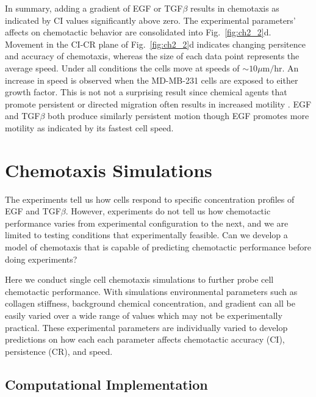 In summary, adding a gradient of EGF or TGF$\beta$ results in chemotaxis as indicated by CI values significantly above zero. The experimental parameters' affects on chemotactic behavior are consolidated into Fig.\ \ref{fig:ch2_2}d. Movement in the CI-CR plane of Fig.\ \ref{fig:ch2_2}d indicates changing persitence and accuracy of chemotaxis, whereas the size of each data point represents the average speed. Under all conditions the cells move at speeds of $\sim 10 \mu\text{m}/\text{hr}$. An increase in speed is observed when the MD-MB-231 cells are exposed to either growth factor. This is not not a surprising result since chemical agents that promote persistent or directed migration often results in increased motility \cite{petrie2009random}. EGF and TGF$\beta$ both produce similarly persistent motion though EGF promotes more motility as indicated by its fastest cell speed.


\section{Chemotaxis Simulations}

The experiments tell us how cells respond to specific concentration profiles of EGF and TGF$\beta$. However, experiments do not tell us how chemotactic performance varies from experimental configuration to the next, and we are limited to testing conditions that experimentally feasible. Can we develop a model of chemotaxis that is capable of predicting chemotactic performance before doing experiments?

Here we conduct single cell chemotaxis simulations to further probe cell chemotactic performance. With simulations environmental parameters such as collagen stiffness, background chemical concentration, and gradient can all be easily varied over a wide range of values which may not be experimentally practical. These experimental parameters are individually varied to develop predictions on how each each parameter affects chemotactic accuracy (CI), persistence (CR), and speed.


\subsection{Computational Implementation}

